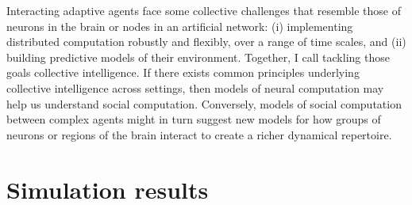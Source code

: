 \documentclass[]{article}
\begin{document}
Interacting adaptive agents face some collective challenges that resemble those of neurons in the brain or nodes in an artificial network: (i) implementing distributed computation robustly and flexibly, over a range of time scales, and (ii) building predictive models of their environment. Together, I call tackling those goals collective intelligence. If there exists common principles underlying collective intelligence across settings, then models of neural computation may help us understand social computation. Conversely, models of social computation between complex agents might in turn suggest new models for how groups of neurons or regions of the brain interact to create a richer dynamical repertoire.

\printbibliography[heading=bibintoc, title={References}]

\newpage

\appendix

\section{Simulation results}
\end{document}
